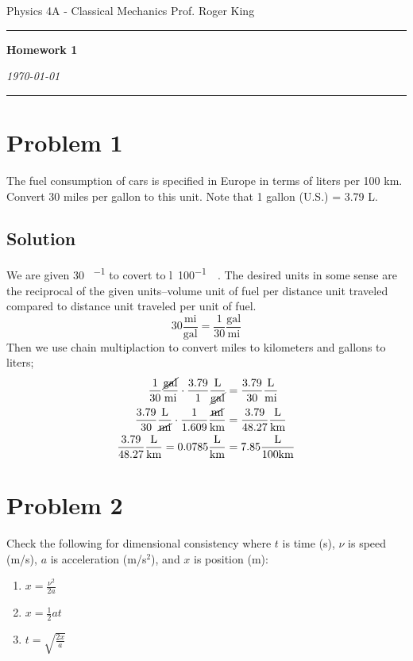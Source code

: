 \documentclass{article}
\newcommand{\mile}{\text{mi}}
\newcommand{\gallon}{\text{gal}}
\newcommand{\kilo}{\text{k}}
\newcommand{\liter}{\text{L}}
\newcommand{\meter}{\text{m}}
\begin{document}
\flushleft
Physics 4A - Classical Mechanics \hfill Prof. Roger King\\
\hrule

\begin{center}
    \vspace{14pt}
    \textbf{\LARGE Homework 1} \\
    \vspace{12pt}

    \textit{\today}
    \vspace{14pt}
\end{center}

\hrule

\section*{Problem 1}
The fuel consumption of cars is specified in Europe in terms of liters per 100 km. Convert
30 miles per gallon to this unit. Note that 1 gallon (U.S.) = 3.79 L.

\subsection*{Solution}
We are given 30 \si{{\mile\per\gallon}} to covert to \si{{\litre\per100\kilo\meter}}. The desired units in some sense are the reciprocal of the given units--volume unit of fuel per distance unit traveled compared to distance unit traveled per unit of fuel.
\[
	30 \frac{\mile}{\gallon} = \frac{1}{30} \frac{\text{gal}}{\mile}
\]
Then we use chain multiplaction to convert miles to kilometers and gallons to liters;
\begin{align*}
	\frac{1}{30} \frac{\cancel{\gallon}}{\mile} \cdot \frac{3.79}{1} \frac{\liter}{\cancel{\gallon}} &= \frac{3.79}{30} \frac{\liter}{\mile} \\
	\frac{3.79}{30} \frac{\liter}{\cancel{\mile}} \cdot \frac{1}{1.609} \frac{\cancel{\mile}}{\kilo\meter} &= \frac{3.79}{48.27} \frac{\liter}{\kilo\meter} \\
	\frac{3.79}{48.27} \frac{\liter}{\kilo\meter} = 0.0785 \frac{\liter}{\kilo\meter} &= 7.85 \frac{\liter}{100 \kilo\meter}
\end{align*}

\section*{Problem 2}
Check the following for dimensional consistency where $t$ is time (s), $\nu$ is speed (m/s), $a$ is acceleration (m/s$^2$), and $x$ is position (m):
\begin{enumerate}
	\item $x = \frac{\nu^2}{2a}$
	\item $x = \frac{1}{2}at$
	\item $t = \sqrt{\frac{2x}{a}}$
\end{enumerate}
\end{document}
